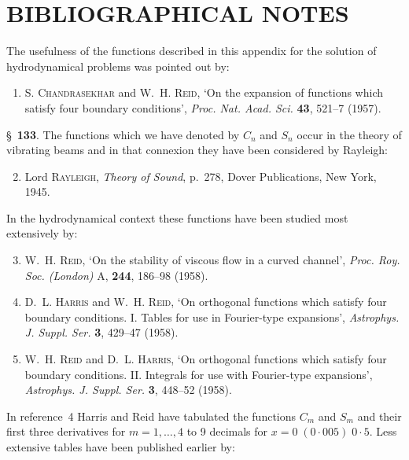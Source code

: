 \section*{BIBLIOGRAPHICAL NOTES}

The usefulness of the functions described in this appendix for the solution of
hydrodynamical problems was pointed out by:

\begin{enumerate}
\item S. \textsc{Chandrasekhar} and W.~H. \textsc{Reid}, `On the expansion of functions which
satisfy four boundary conditions', \textit{Proc. Nat. Acad. Sci.} \textbf{43}, 521--7 (1957).
\end{enumerate}

\noindent\S~\textbf{133}. The functions which we have denoted by $C_n$ and $S_n$ occur in the theory of
vibrating beams and in that connexion they have been considered by Rayleigh:

\begin{enumerate}
\setcounter{enumi}{1}
\item Lord \textsc{Rayleigh}, \textit{Theory of Sound}, p.~278, Dover Publications, New York,
1945.
\end{enumerate}

\noindent In the hydrodynamical context these functions have been studied most extensively by:

\begin{enumerate}
\setcounter{enumi}{2}
\item W.~H. \textsc{Reid}, `On the stability of viscous flow in a curved channel', \textit{Proc.
Roy. Soc. (London)} A, \textbf{244}, 186--98 (1958).

\item D.~L. \textsc{Harris} and W.~H. \textsc{Reid}, `On orthogonal functions which satisfy
four boundary conditions. I. Tables for use in Fourier-type expansions',
\textit{Astrophys. J. Suppl. Ser.} \textbf{3}, 429--47 (1958).

\item W.~H. \textsc{Reid} and D.~L. \textsc{Harris}, `On orthogonal functions which satisfy
four boundary conditions.  II. Integrals for use with Fourier-type expansions', \textit{Astrophys. J. Suppl. Ser.} \textbf{3}, 448--52 (1958).
\end{enumerate}

\noindent In reference~4 Harris and Reid have tabulated the functions $C_m$ and $S_m$ and their
first three derivatives for $m = 1, \ldots, 4$ to 9 decimals for $x = 0\;(0{\cdot}005)\;0{\cdot}5$. Less
extensive tables have been published earlier by:

